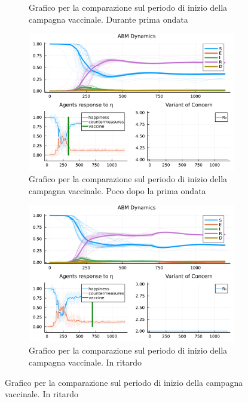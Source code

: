 \begin{figure}[!hb]
\begin{subfigure}[b]{0.45\textwidth}
		\caption{Grafico per la comparazione sul periodo di inizio della campagna vaccinale. Durante prima ondata}
		\label{fig:comparison_all_2}
	\end{subfigure}
	\hfill
	\begin{subfigure}[b]{0.45\textwidth}
		\centering
		\includegraphics[width=\textwidth]{img/SocialNetworkABM_4_A.pdf}
		\caption{Grafico per la comparazione sul periodo di inizio della campagna vaccinale. Poco dopo la prima ondata}
		\label{fig:comparison_all_3}
	\end{subfigure}
	\hfill
	\begin{subfigure}[b]{0.45\textwidth}
		\centering
		\includegraphics[width=\textwidth]{img/SocialNetworkABM_2_A.pdf}
		\caption{Grafico per la comparazione sul periodo di inizio della campagna vaccinale. In ritardo}
		\label{fig:comparison_all_4}
	\end{subfigure}
\end{figure}
\newpage

